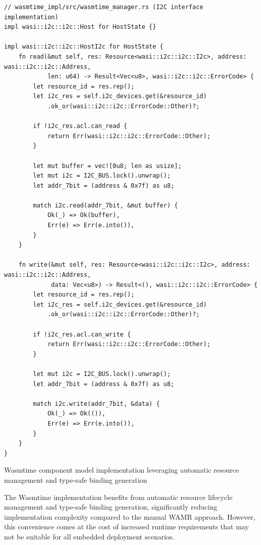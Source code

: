\begin{listing}[H]
\begin{verbatim}
// wasmtime_impl/src/wasmtime_manager.rs (I2C interface implementation)
impl wasi::i2c::i2c::Host for HostState {}

impl wasi::i2c::i2c::HostI2c for HostState {
    fn read(&mut self, res: Resource<wasi::i2c::i2c::I2c>, address: wasi::i2c::i2c::Address,
            len: u64) -> Result<Vec<u8>, wasi::i2c::i2c::ErrorCode> {
        let resource_id = res.rep();
        let i2c_res = self.i2c_devices.get(&resource_id)
            .ok_or(wasi::i2c::i2c::ErrorCode::Other)?;

        if !i2c_res.acl.can_read {
            return Err(wasi::i2c::i2c::ErrorCode::Other);
        }

        let mut buffer = vec![0u8; len as usize];
        let mut i2c = I2C_BUS.lock().unwrap();
        let addr_7bit = (address & 0x7f) as u8;

        match i2c.read(addr_7bit, &mut buffer) {
            Ok(_) => Ok(buffer),
            Err(e) => Err(e.into()),
        }
    }

    fn write(&mut self, res: Resource<wasi::i2c::i2c::I2c>, address: wasi::i2c::i2c::Address,
             data: Vec<u8>) -> Result<(), wasi::i2c::i2c::ErrorCode> {
        let resource_id = res.rep();
        let i2c_res = self.i2c_devices.get(&resource_id)
            .ok_or(wasi::i2c::i2c::ErrorCode::Other)?;

        if !i2c_res.acl.can_write {
            return Err(wasi::i2c::i2c::ErrorCode::Other);
        }

        let mut i2c = I2C_BUS.lock().unwrap();
        let addr_7bit = (address & 0x7f) as u8;

        match i2c.write(addr_7bit, &data) {
            Ok(_) => Ok(()),
            Err(e) => Err(e.into()),
        }
    }
}
\end{verbatim}
\caption{Wasmtime component model implementation leveraging automatic resource management and type-safe binding generation}
\label{lst:wasmtime-implementation}
\end{listing}

The Wasmtime implementation benefits from automatic resource lifecycle management and type-safe binding generation, significantly reducing implementation complexity compared to the manual WAMR approach. However, this convenience comes at the cost of increased runtime requirements that may not be suitable for all embedded deployment scenarios.

